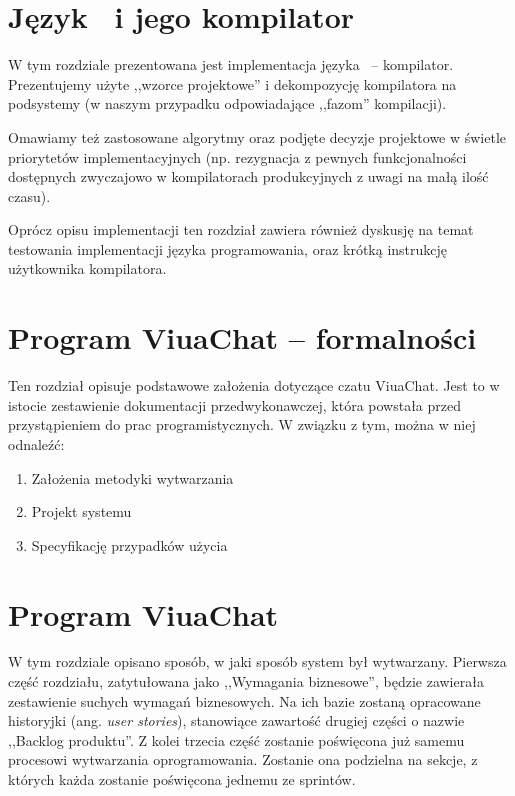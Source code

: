 \documentclass[11pt,oneside,a4paper,titlepage,onecolumn]{book}
\begin{document}
\section{Język \ViuAct\ i jego kompilator}

W tym rozdziale prezentowana jest implementacja języka \ViuAct\ -- kompilator. Prezentujemy użyte ,,wzorce
projektowe'' i dekompozycję kompilatora na podsystemy (w naszym przypadku odpowiadające ,,fazom'' kompilacji).

Omawiamy też zastosowane algorytmy oraz podjęte decyzje projektowe w świetle priorytetów implementacyjnych
(np. rezygnacja z pewnych funkcjonalności dostępnych zwyczajowo w kompilatorach produkcyjnych z uwagi na małą
ilość czasu).

Oprócz opisu implementacji ten rozdział zawiera również dyskusję na temat testowania implementacji języka
programowania, oraz krótką instrukcję użytkownika kompilatora.


\section{Program ViuaChat -- formalności}

Ten rozdział opisuje podstawowe założenia dotyczące
czatu ViuaChat. Jest to w istocie zestawienie dokumentacji przedwykonawczej, która powstała przed przystąpieniem do prac programistycznych. W związku z tym, można w niej odnaleźć:
\begin{enumerate}
  \item Założenia metodyki wytwarzania
  \item Projekt systemu
  \item Specyfikację przypadków użycia
\end{enumerate}

\section{Program ViuaChat}

W tym rozdziale opisano sposób, w jaki sposób system był wytwarzany. Pierwsza część rozdziału, zatytułowana jako ,,Wymagania biznesowe'', będzie zawierała zestawienie suchych wymagań biznesowych. Na ich bazie zostaną opracowane historyjki (ang. \textit{user stories}), stanowiące zawartość drugiej części o nazwie ,,Backlog produktu''. Z kolei trzecia część zostanie poświęcona już samemu procesowi wytwarzania oprogramowania. Zostanie ona podzielna na sekcje, z których każda zostanie poświęcona jednemu ze sprintów.
\end{document}
